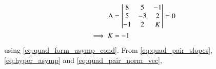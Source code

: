 \begin{enumerate}
\begin{align}
\Delta&=
\begin{vmatrix}
8 & 5 & -1\\ 5& -3 & 2\\ -1 & 2 & K
\end{vmatrix} = 0
\\
\implies K&=-1
\end{align}
using \eqref{eq:quad_form_asymp_cond}.  From \eqref{eq:quad_pair_slopes},  \eqref{eq:hyper_asymp} and \eqref{eq:quad_pair_norm_vec},

\end{enumerate}
